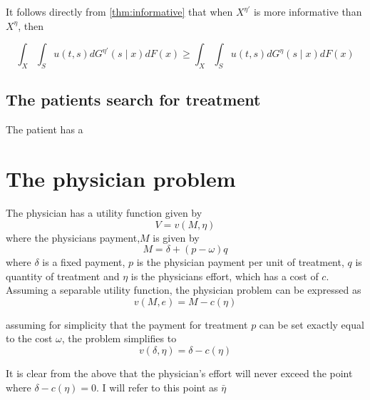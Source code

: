 \documentclass[10pt,a4paper]{article} 					%
\begin{document}
It follows directly from \cref{thm:informative} that when $X^{\eta'}$ is more informative than $X^{\eta}$, then

\[
	\int_{X}\int_{S}u(t,s)dG^{\eta'}(s\mid x)dF(x)\ge\int_{X}\int_{S}u(t,s)dG^{\eta}(s\mid x)dF(x)
\]

\subsection{The patients search for treatment}

The patient has a  

\section{The physician problem}

The physician has a utility function given by
\[
	V=v(M,\eta)\label{eq:physician-utility}
\]
where the physicians payment,$M$ is given by
\[
	M=\delta+(p-\omega)q
\]
where $\delta$ is a fixed payment, $p$ is the physician payment per unit of treatment, $q$ is quantity of treatment and $\eta$ is the physicians effort, which has a cost of $c$. Assuming a separable utility function, the physician problem can be expressed as
\[
	v(M,e)=M-c(\eta)
\] 

assuming for simplicity that the payment for treatment $p$ can be set exactly equal to the cost $\omega$, the problem simplifies to 
\[
	v(\delta,\eta)=\delta-c(\eta)
\] 

It is clear from the above that the physician's effort will never exceed the point where $\delta-c(\eta)=0$. I will refer to this point as $\bar{\eta}$

\printbibliography%

\end{document}
